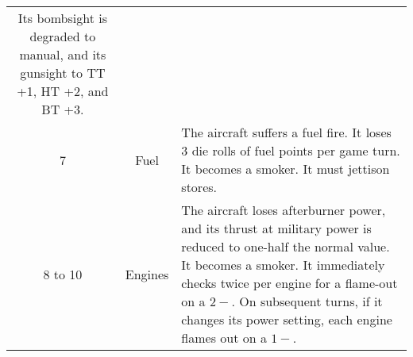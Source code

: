{\begin{twocolumntablefloat}
\begin{twocolumntable}
{\begin{tabularx}{\linewidth}{ccX}
Its bombsight is degraded to manual, and its gunsight to TT +1, HT +2, and BT +3.
\\
7&Fuel&
The aircraft suffers a fuel fire.
It loses 3 die rolls of fuel points per game turn. 
It becomes a smoker.
It must jettison stores.
\\
8 to 10&Engines&
The aircraft loses afterburner power, and its thrust at military power is reduced to one-half the normal value.
It becomes a smoker.
It immediately checks twice per engine for a flame-out on a $2-$. On subsequent turns, if it changes its power setting, each engine flames out on a $1-$.
\\
\bottomrule
\end{tabularx}

}

\end{twocolumntable}
\end{twocolumntablefloat}

}
